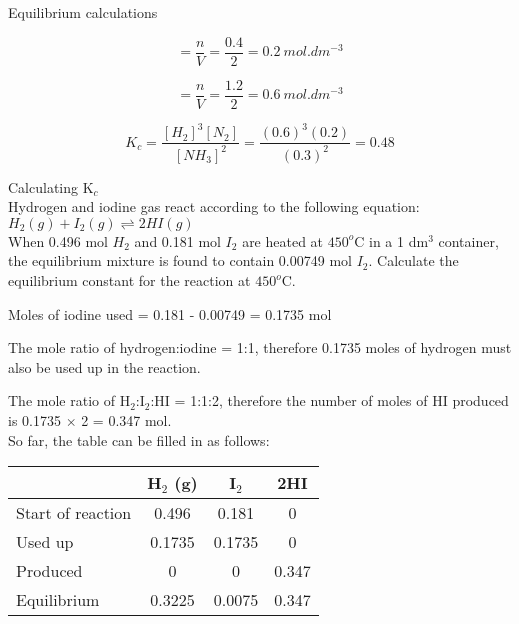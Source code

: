 \begin{wex}{Equilibrium calculations}
{\begin{equation*}
[N_{2}] = \frac{n}{V} = \frac{0.4}{2} = 0.2 \ mol.dm^{-3}
\end{equation*}

\begin{equation*}
[H_{2}] = \frac{n}{V} = \frac{1.2}{2} = 0.6 \ mol.dm^{-3}
\end{equation*}

\begin{equation*}
K_{c} = \frac{[H_{2}]^{3}[N_{2}]}{[NH_{3}]^{2}} = \frac{(0.6)^{3}(0.2)}{(0.3)^{2}} = 0.48
\end{equation*}
}
\end{wex}

\begin{wex}{Calculating K$_{c}$\\}{
Hydrogen and iodine gas react according to the following equation:\\

$H_{2}(g) + I_{2}(g) \rightleftharpoons 2HI(g)$\\

When 0.496 mol $H_{2}$ and 0.181 mol $I_{2}$ are heated at $450^{o}$C in a 1 dm$^{3}$ container, the equilibrium mixture is found to contain 0.00749 mol $I_{2}$. Calculate the equilibrium constant for the reaction at $450^{o}$C. \\}

{

Moles of iodine used = 0.181 - 0.00749 = 0.1735 mol\\
}

{

The mole ratio of hydrogen:iodine = 1:1, therefore 0.1735 moles of hydrogen must also be used up in the reaction.\\

The mole ratio of H$_{2}$:I$_{2}$:HI = 1:1:2, therefore the number of moles of HI produced is 0.1735 $\times$ 2 = 0.347 mol.\\

So far, the table can be filled in as follows:
 
\begin{center}
\begin{tabular}{|l|c|c|c|}\hline
 & \textbf{H$_{2}$ (g)} & \textbf{I$_{2}$} & \textbf{2HI}\\\hline
Start of reaction & 0.496 & 0.181 & 0 \\\hline
Used up & 0.1735 & 0.1735 & 0\\\hline
Produced & 0 & 0 & 0.347 \\\hline
Equilibrium & 0.3225 & 0.0075 & 0.347  \\\hline
\end{tabular}
\end{center}

}
\end{wex}
